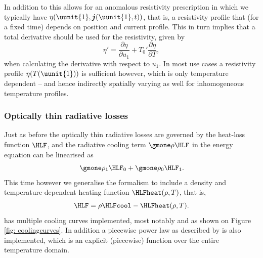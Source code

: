 In addition to this {\legolas} allows for an anomalous resistivity prescription in which we typically have $\eta(\uunit{1}, \boldsymbol{j}(\uunit{1}, t))$, that is, a resistivity profile that (for a fixed time) depends on position and current profile. This in turn implies that a total derivative should be used for the resistivity, given by
\begin{equation}
  \eta' = \frac{\partial \eta}{\partial u_1} + T_0'\frac{\partial \eta}{\partial T},
\end{equation}
when calculating the derivative with respect to $u_1$. In most use cases a resistivity profile $\eta(T(\uunit{1}))$ is sufficient however, which is only temperature dependent -- and hence indirectly spatially varying as well for inhomogeneous temperature profiles.

\subsubsection{Optically thin radiative losses}
Just as before the optically thin radiative losses are governed by the heat-loss function $\HLF$, and the radiative cooling term $\gmone \rho \HLF$ in the energy equation can be linearised as
\begin{equation}
  \gmone \rho_1 \HLF_0 + \gmone \rho_0 \HLF_1.
\end{equation}
This time however we generalise the formalism to include a density and temperature-dependent heating function
$\HLFheat(\rho, T)$, that is,
\begin{equation}
  \HLF = \rho\HLFcool - \HLFheat(\rho, T).
\end{equation}
{\legolas} has multiple cooling curves implemented, most notably {\jccorona} and {\spexdm} as shown on Figure \ref{fig: coolingcurves}. In addition a piecewise power law as described by \citet{rosner1978} is also implemented, which is an explicit (piecewise) function over the entire temperature domain.

